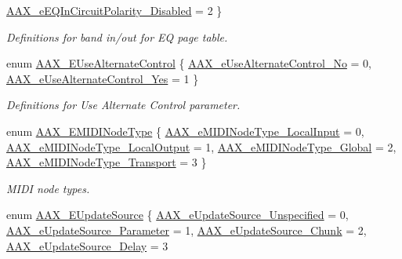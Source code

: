 \begin{DoxyCompactItemize}
\hyperlink{a00206_ab5bda96f09874705e9b800d1b1495b48a4a85b608d03de4997616de1e95610208}{A\+A\+X\+\_\+e\+E\+Q\+In\+Circuit\+Polarity\+\_\+\+Disabled} = 2
 \}
\begin{DoxyCompactList}\small\item\em Definitions for band in/out for E\+Q page table. \end{DoxyCompactList}\item 
enum \hyperlink{a00206_abbcc8b4e8207262a5dd9e32047a51a29}{A\+A\+X\+\_\+\+E\+Use\+Alternate\+Control} \{ \hyperlink{a00206_abbcc8b4e8207262a5dd9e32047a51a29a5cfea068cc7ea51becccc9d26955e443}{A\+A\+X\+\_\+e\+Use\+Alternate\+Control\+\_\+\+No} = 0, 
\hyperlink{a00206_abbcc8b4e8207262a5dd9e32047a51a29aa63097dc0b27e51411f30b06b2db26f1}{A\+A\+X\+\_\+e\+Use\+Alternate\+Control\+\_\+\+Yes} = 1
 \}
\begin{DoxyCompactList}\small\item\em Definitions for Use Alternate Control parameter. \end{DoxyCompactList}\item 
enum \hyperlink{a00206_a5e1dffce35d05990dbbad651702678e4}{A\+A\+X\+\_\+\+E\+M\+I\+D\+I\+Node\+Type} \{ \hyperlink{a00206_a5e1dffce35d05990dbbad651702678e4ae57de2b04978fe2e75f5bdeb034bda44}{A\+A\+X\+\_\+e\+M\+I\+D\+I\+Node\+Type\+\_\+\+Local\+Input} = 0, 
\hyperlink{a00206_a5e1dffce35d05990dbbad651702678e4acc1b5f2109c508b20a65b5e0fdcd643f}{A\+A\+X\+\_\+e\+M\+I\+D\+I\+Node\+Type\+\_\+\+Local\+Output} = 1, 
\hyperlink{a00206_a5e1dffce35d05990dbbad651702678e4a2be91828f8c1dac20ab5dff136fc1fce}{A\+A\+X\+\_\+e\+M\+I\+D\+I\+Node\+Type\+\_\+\+Global} = 2, 
\hyperlink{a00206_a5e1dffce35d05990dbbad651702678e4ac2ff856aec0724907dfd95b8e3ccbc20}{A\+A\+X\+\_\+e\+M\+I\+D\+I\+Node\+Type\+\_\+\+Transport} = 3
 \}
\begin{DoxyCompactList}\small\item\em M\+I\+D\+I node types. \end{DoxyCompactList}\item 
enum \hyperlink{a00206_a30be0398faf20c6b121239eb9399f3f7}{A\+A\+X\+\_\+\+E\+Update\+Source} \{ \hyperlink{a00206_a30be0398faf20c6b121239eb9399f3f7aec16143f3916bad3c5a6d8eb60600a3b}{A\+A\+X\+\_\+e\+Update\+Source\+\_\+\+Unspecified} = 0, 
\hyperlink{a00206_a30be0398faf20c6b121239eb9399f3f7a401db669e68d5255c1126f7bf183b7ca}{A\+A\+X\+\_\+e\+Update\+Source\+\_\+\+Parameter} = 1, 
\hyperlink{a00206_a30be0398faf20c6b121239eb9399f3f7ab3162148ff1f2c393cd3a03c4479a497}{A\+A\+X\+\_\+e\+Update\+Source\+\_\+\+Chunk} = 2, 
\hyperlink{a00206_a30be0398faf20c6b121239eb9399f3f7a221226f8de93849d1f5bbe773b230a3a}{A\+A\+X\+\_\+e\+Update\+Source\+\_\+\+Delay} = 3

\end{DoxyCompactItemize}
